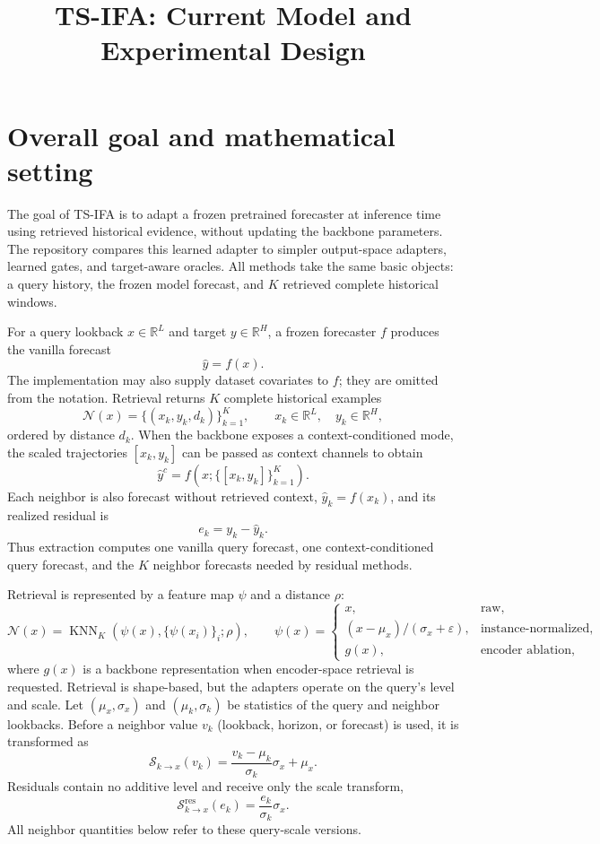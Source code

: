 \documentclass[11pt]{article}
\title{\vspace{-1em}TS-IFA: Current Model and Experimental Design\vspace{-0.5em}}
\author{}
\date{}
\begin{document}
\maketitle

\section{Overall goal and mathematical setting}

The goal of TS-IFA is to adapt a frozen pretrained forecaster at inference time
using retrieved historical evidence, without updating the backbone parameters.
The repository compares this learned adapter to simpler output-space adapters,
learned gates, and target-aware oracles.  All methods take the same basic
objects: a query history, the frozen model forecast, and $K$ retrieved complete
historical windows.

For a query lookback $x\in\mathbb{R}^{L}$ and target
$y\in\mathbb{R}^{H}$, a frozen forecaster $f$ produces the vanilla forecast
\[
  \hat y=f(x).
\]
The implementation may also supply dataset covariates to $f$; they are omitted
from the notation.  Retrieval returns $K$ complete historical examples
\[
  \mathcal N(x)=\{(x_k,y_k,d_k)\}_{k=1}^{K},
  \qquad x_k\in\mathbb{R}^{L},\quad y_k\in\mathbb{R}^{H},
\]
ordered by distance $d_k$.  When the backbone exposes a context-conditioned
mode, the scaled trajectories $[x_k,y_k]$ can be passed as context channels to
obtain
\[
  \hat y^c=f\!\left(x;\{[x_k,y_k]\}_{k=1}^{K}\right).
\]
Each neighbor is also forecast without retrieved context,
$\hat y_k=f(x_k)$, and its realized residual is
\[
  e_k=y_k-\hat y_k.
\]
Thus extraction computes one vanilla query forecast, one context-conditioned
query forecast, and the $K$ neighbor forecasts needed by residual methods.

Retrieval is represented by a feature map $\psi$ and a distance $\rho$:
\[
\mathcal N(x)=\operatorname{KNN}_K
\left(\psi(x),\{\psi(x_i)\}_i;\rho\right),\qquad
\psi(x)=
\begin{cases}
x, & \text{raw},\\[2mm]
(x-\mu_x)/(\sigma_x+\varepsilon), & \text{instance-normalized},\\[2mm]
g(x), & \text{encoder ablation},
\end{cases}
\]
where $g(x)$ is a backbone representation when encoder-space retrieval is
requested.  Retrieval is shape-based, but the adapters operate on the query's
level and scale.  Let $(\mu_x,\sigma_x)$ and $(\mu_k,\sigma_k)$ be statistics
of the query and neighbor lookbacks.  Before a neighbor value $v_k$ (lookback,
horizon, or forecast) is used, it is transformed as
\[
  \mathcal S_{k\rightarrow x}(v_k)
  =\frac{v_k-\mu_k}{\sigma_k}\sigma_x+\mu_x.
\]
Residuals contain no additive level and receive only the scale transform,
\[
  \mathcal S^{\mathrm{res}}_{k\rightarrow x}(e_k)
  =\frac{e_k}{\sigma_k}\sigma_x.
\]
All neighbor quantities below refer to these query-scale versions.
\end{document}

